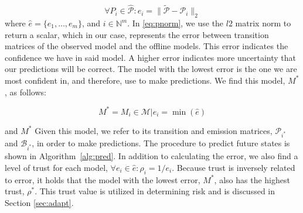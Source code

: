 \documentclass[letterpaper, 10 pt, conference]{ieeeconf}  %
\newcommand\NB[1]{$\spadesuit$\footnote{NB: #1}}
\begin{document}
 
\begin{equation} \label{eq:pnorm}
    \forall{P_i} \in \hat{\mathcal{P}}: e_i = \lVert\tilde{\mathcal{P}}-\mathcal{P}_{i}\rVert_{2}
\end{equation}
where $\hat{e} = \{e_1,\ldots,e_m\}$, and $i\in\mathbb{N}^m$. In \eqref{eq:pnorm}, we use the $l2$ matrix norm to return a scalar, which in our case, represents the error between transition matrices of the observed model and the offline models. This error indicates the confidence we have in said model. A higher error indicates more uncertainty that our predictions will be correct. The model with the lowest error is the one we are most confident in, and therefore, use to make predictions. We find this model, $M^*$, as follows: %

\begin{equation}
    M^*=M_i\in\mathcal{M}\vert e_i = \min(\hat{e})
\end{equation}

and $M^*$ %
  Given this model, we refer to its transition and emission matrices, $\mathcal{P}_{i^*}$ and $\mathcal{B}_{i^*}$, in order to make predictions. The procedure to predict future states is shown in Algorithm~\ref{alg:pred}. In addition to calculating the error, we also find a level of trust for each model, $\forall e_i \in\hat{e}: \rho_i = 1/e_i$. Because trust is inversely related to error, it holds that the model with the lowest error, $M^*$, also has the highest trust, $\rho^*$. This trust value is utilized in determining risk and is discussed in Section \ref{sec:adapt}. 
  
  
  
  
\end{document}
